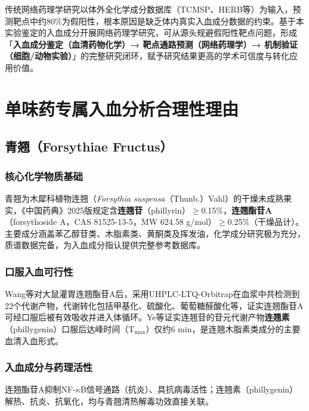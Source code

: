 \documentclass[12pt,a4paper,UTF8,openany]{ctexbook}
\newcommand{\compoundname}[1]{\textbf{#1}}
\newcommand{\herbname}[1]{\textit{#1}}
\begin{document}
传统网络药理学研究以体外全化学成分数据库（TCMSP、HERB等）为输入，预测靶点中约80\%为假阳性，根本原因是缺乏体内真实入血成分数据的约束\cite{LiuY2024}。基于本实验鉴定的入血成分开展网络药理学研究，可从源头规避假阳性靶点问题，形成「\textbf{入血成分鉴定（血清药物化学）→ 靶点通路预测（网络药理学）→ 机制验证（细胞/动物实验）}」的完整研究闭环，赋予研究结果更高的学术可信度与转化应用价值\cite{Feng2021NP,LiuY2023}。

\section{单味药专属入血分析合理性理由}

\subsection{青翘（Forsythiae Fructus）}

\subsubsection{核心化学物质基础}

青翘为木犀科植物连翘（\herbname{Forsythia suspensa}（Thunb.）Vahl）的干燥未成熟果实，《中国药典》2025版规定含\compoundname{连翘苷}（phillyrin）$\geq$0.15\%，\compoundname{连翘酯苷A}（forsythoside A，CAS 81525-13-5，MW 624.58 g/mol）$\geq$0.25\%（干燥品计）。主要成分涵盖苯乙醇苷类、木脂素类、黄酮类及挥发油，化学成分研究极为充分，质谱数据完备，为入血成分指认提供完整参考数据库\cite{Review2021FA}。

\subsubsection{口服入血可行性}

Wang等\cite{WangF2018}对大鼠灌胃连翘酯苷A后，采用UHPLC-LTQ-Orbitrap在血浆中共检测到22个代谢产物，代谢转化包括甲基化、硫酸化、葡萄糖醛酸化等，证实连翘酯苷A可经口服后被有效吸收并进入体循环。Ye等\cite{Ye2013}证实连翘苷的苷元代谢产物\compoundname{连翘素}（phillygenin）口服后达峰时间（T$_{\text{max}}$）仅约6 min，是连翘木脂素类成分的主要血清入血形式。

\subsubsection{入血成分与药理活性}

连翘酯苷A抑制NF-$\kappa$B信号通路（抗炎）、具抗病毒活性；连翘素（phillygenin）解热、抗炎、抗氧化，均与青翘清热解毒功效直接关联。
\end{document}
